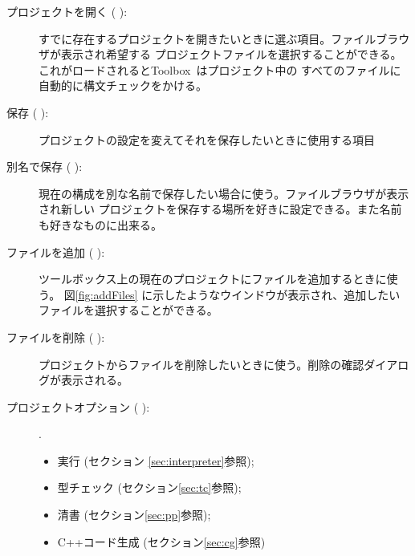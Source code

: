 \documentclass[\pformat,12pt]{article}
\newcommand{\Toolbox}{Toolbox}
\newcommand{\Toolbox}{Toolbox}
\newcommand{\guicmd}[1]{{\sf #1}}
\newcommand{\guicmd}[1]{{\gt #1}}
\begin{document}
\begin{description}
\item[\guicmd{プロジェクトを開く} (\hspace{-1.2mm}
\hspace{.6mm}):]
  すでに存在するプロジェクトを開きたいときに選ぶ項目。ファイルブラウザが表示され希望する
  プロジェクトファイルを選択することができる。これがロードされると\Toolbox\ はプロジェクト中の
  すべてのファイルに自動的に構文チェックをかける。

\item[\guicmd{保存} (\hspace{-1.8mm}
):]
  プロジェクトの設定を変えてそれを保存したいときに使用する項目

\item[\guicmd{別名で保存} (\hspace{-1.5mm}
):]
  現在の構成を別な名前で保存したい場合に使う。ファイルブラウザが表示され新しい
  プロジェクトを保存する場所を好きに設定できる。また名前も好きなものに出来る。

\item[\guicmd{ファイルを追加} (\hspace{-1.5mm}
):] 
  ツールボックス上の現在のプロジェクトにファイルを追加するときに使う。
  図\ref{fig:addFiles} に示したようなウインドウが表示され、追加したいファイルを選択することができる。

\item[\guicmd{ファイルを削除} (\hspace{-1.5mm}
 ):]
 プロジェクトからファイルを削除したいときに使う。削除の確認ダイアログが表示される。

\item[\guicmd{プロジェクトオプション} (\hspace{-1.5mm}
):].
  \begin{itemize}
    \item \guicmd{実行} (セクション \ref{sec:interpreter}参照);
    \item \guicmd{型チェック}  (セクション\ref{sec:tc}参照);
    \item \guicmd{清書}  (セクション\ref{sec:pp}参照);
    \item \guicmd{C++コード生成} (セクション\ref{sec:cg}参照)


\end{itemize}
\end{description}
\end{document}
